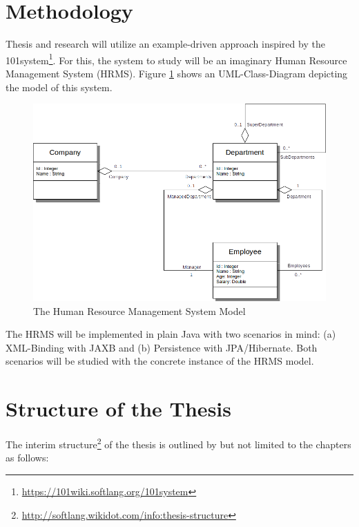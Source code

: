 \documentclass[runningheads,a4paper]{llncs}
\newcommand{\footnoteurl}[1]{\footnote{\url{#1}}}
\begin{document}
\section{Methodology}
\label{section:Methodology}
Thesis and research will utilize an example-driven approach inspired by the 101system\footnoteurl{https://101wiki.softlang.org/101system}.
For this, the system to study will be an imaginary Human Resource Management System (HRMS).
Figure \ref{figure:TheCompanyModel} shows an UML-Class-Diagram depicting the model of this system.

\begin{figure}[h!]
\centering
\includegraphics[width=\textwidth]{companies.png}
\caption{The Human Resource Management System Model}
\label{figure:TheCompanyModel}
\end{figure}

The HRMS will be implemented in plain Java with two scenarios in mind:
(a) XML-Binding with JAXB
and (b) Persistence with JPA/Hibernate.
Both scenarios will be studied with the concrete instance of the HRMS model.


\section{Structure of the Thesis}
\label{section:StructureOfTheThesis}
The interim structure\footnoteurl{http://softlang.wikidot.com/info:thesis-structure} of the thesis is outlined by but not limited to the chapters as follows:
\end{document}
